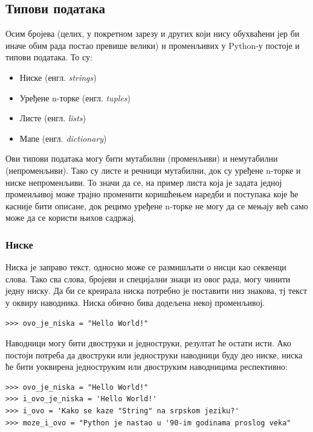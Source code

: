 \subsection{Типови података}

Осим бројева (целих, у покретном зарезу и других који нису обухваћени јер би иначе обим рада постао превише велики) и променљивих у Python-у постоје и типови података. То су:

\begin{itemize}
\item Ниске (енгл. \emph{strings})
\item Уређене n-торке (енгл. \emph{tuples})
\item Листе (енгл. \emph{lists})
\item Мапе (енгл. \emph{dictionary})
\end{itemize}

Ови типови података могу бити мутабилни (променљиви) и немутабилни (непроменљиви). Тако су листе и речници мутабилни, док су уређене n-торке и ниске непроменљиви. То значи да се, на пример листа која је задата једној променљивој може трајно променити коришћењем наредби и поступака које ће касније бити описане, док рецимо уређене n-торке не могу да се мењају већ само може да се користи њихов садржај.

\subsubsection{Ниске}

Ниска је заправо текст, односно може се размишљати о нисци као секвенци слова. Тако сва слова, бројеви и специјални знаци из овог рада, могу чинити једну ниску. Да би се креирала ниска потребно је поставити низ знакова, тј текст у оквиру наводника. Ниска обично бива додељена некој променљивој.

\begin{lstlisting}[caption = Креирање ниске, label = kreiranje_stringa]
>>> ovo_je_niska = "Hello World!"
\end{lstlisting}

Наводници могу бити двоструки и једноструки, резултат ће остати исти. Ако постоји потреба да двоструки или једноструки наводници буду део ниске, ниска ће бити уоквирена једноструким или двоструким наводницима респективно:

\begin{lstlisting}[caption = Примери креирања ниски, label = navodnici]
>>> ovo_je_niska = "Hello World!"
>>> i_ovo_je_niska = 'Hello World!'
>>> i_ovo = 'Kako se kaze "String" na srpskom jeziku?'
>>> moze_i_ovo = "Python je nastao u '90-im godinama proslog veka"
\end{lstlisting}

